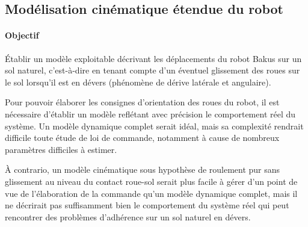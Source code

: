 







\subsection{Modélisation cinématique étendue du robot}

\paragraph{Objectif}

Établir un modèle exploitable décrivant les déplacements du robot Bakus sur un sol naturel, c'est-à-dire en tenant compte d'un éventuel glissement des roues sur le sol lorsqu'il est en dévers (phénomène de dérive latérale et angulaire).

Pour pouvoir élaborer les consignes d'orientation des roues du robot, il est nécessaire d'établir un modèle reflétant avec précision le comportement réel du système. Un modèle dynamique complet serait idéal, mais sa complexité rendrait difficile toute étude de loi de commande, notamment à cause de nombreux paramètres difficiles à estimer.

À contrario, un modèle cinématique sous hypothèse de roulement pur sans glissement au niveau du contact roue-sol serait plus facile à gérer d'un point de vue de l'élaboration de la commande qu'un modèle dynamique complet, mais il ne décrirait pas suffisamment bien le comportement du système réel qui peut rencontrer des problèmes d'adhérence sur un sol naturel en dévers.

